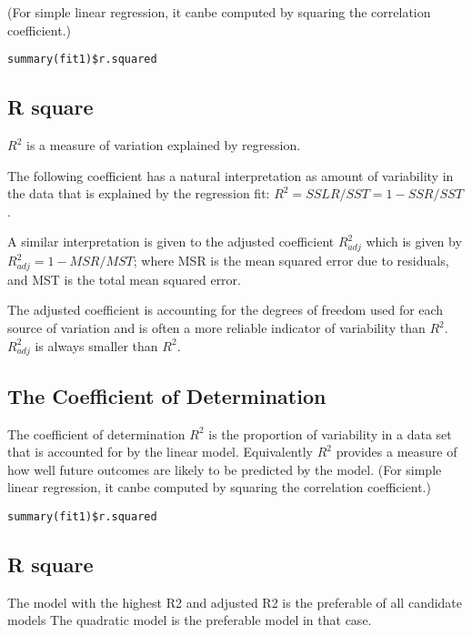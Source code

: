 \documentclass[a4paper,12pt]{article}
\begin{document}
(For simple linear regression, it canbe computed by squaring the correlation coefficient.)

\begin{framed}
\begin{verbatim}
summary(fit1)$r.squared
\end{verbatim}
\end{framed}
\newpage

\subsection{R square}
$R^2$ is a measure of variation explained by regression.

The following coefficient has a natural interpretation as amount of variability in the data that is explained by the regression
fit: $R^2 = SSLR/SST = 1 - SSR/SST$.

A similar interpretation is given to the adjusted coefficient $R^2_{adj}$ which is given by $R^2_{adj} = 1 - MSR/MST $; where
MSR is the mean squared error due to residuals, and MST is the total mean squared error.

The adjusted coefficient is accounting for the degrees of freedom used for each source of variation and is often a more reliable indicator of variability than $R^2$. $R^2_{adj}$ is always smaller
than $R^2$.
\subsection{The Coefficient of Determination}
The coefficient of determination $R^2$ is the proportion of variability in a data set that is accounted for by the linear model.
Equivalently $R^2$ provides a measure of how well future outcomes are likely to be predicted by the model.
(For simple linear regression, it canbe computed by squaring the correlation coefficient.)
\begin{framed}
\begin{verbatim}
summary(fit1)$r.squared
\end{verbatim}
\end{framed}
\newpage

\subsection{R square}
The model with the highest R2 and adjusted R2  is the preferable of all candidate models
The quadratic model is the preferable model in that case.
\end{document}
